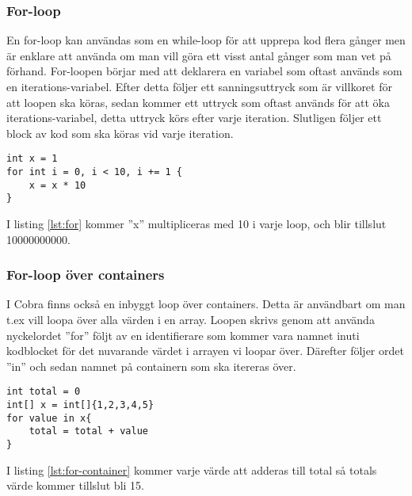\documentclass{TDP003mall}
\begin{document}
\subsubsection{For-loop}
En for-loop kan användas som en while-loop för att upprepa kod flera gånger men är enklare att använda om man vill göra ett visst antal gånger som man vet på förhand.
For-loopen börjar med att deklarera en variabel som oftast används som en iterations-variabel. Efter detta följer ett sanningsuttryck som är villkoret för att loopen ska köras, sedan kommer ett uttryck som oftast används för att öka iterations-variabel, detta uttryck körs efter varje iteration. Slutligen följer ett block av kod som ska köras vid varje iteration.

\begin{lstlisting}[caption=For-loop-exempel, label=lst:for]
int x = 1
for int i = 0, i < 10, i += 1 {
    x = x * 10
}
\end{lstlisting}
I listing \ref{lst:for} kommer ''x'' multipliceras med 10 i varje loop, och blir tillslut 10000000000.
\subsubsection{For-loop över containers}
I Cobra finns också en inbyggt loop över containers. Detta är användbart om man t.ex vill loopa över alla värden i en array. Loopen skrivs genom att använda nyckelordet ''for'' följt av en identifierare som kommer vara namnet inuti kodblocket för det nuvarande värdet i arrayen vi loopar över. Därefter följer ordet ''in'' och sedan namnet på containern som ska itereras över.
\begin{lstlisting}[caption=For-loop-container-exempel, label=lst:for-container]
int total = 0
int[] x = int[]{1,2,3,4,5}
for value in x{
    total = total + value
}
\end{lstlisting}
I listing \ref{lst:for-container} kommer varje värde att adderas till total så totals värde kommer tillslut bli 15.
\end{document}
